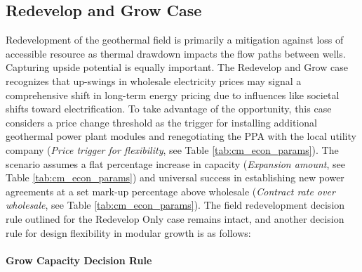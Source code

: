 \subsection{Redevelop and Grow Case}

Redevelopment of the geothermal field is primarily a mitigation against loss of accessible resource as thermal drawdown impacts the flow paths between wells. Capturing upside potential is equally important. The Redevelop and Grow case recognizes that up-swings in wholesale electricity prices may signal a comprehensive shift in long-term energy pricing due to influences like societal shifts toward electrification. To take advantage of the opportunity, this case considers a price change threshold as the trigger for installing additional geothermal power plant modules and renegotiating the PPA with the local utility company (\textit{Price trigger for flexibility}, see Table \ref{tab:cm_econ_params}). The scenario assumes a flat percentage increase in capacity (\textit{Expansion amount}, see Table \ref{tab:cm_econ_params}) and universal success in establishing new power agreements at a set mark-up percentage above wholesale (\textit{Contract rate over wholesale}, see Table \ref{tab:cm_econ_params}). The field redevelopment decision rule outlined for the Redevelop Only case remains intact, and another decision rule for design flexibility in modular growth is as follows:
\\
\\
\textbf{Grow Capacity Decision Rule}
\label{ch4:dr_grow}
